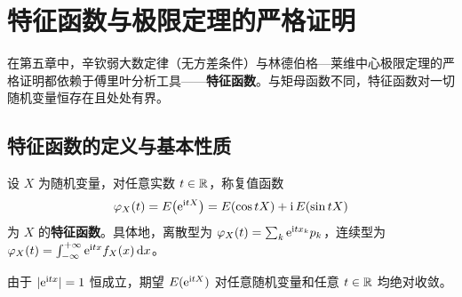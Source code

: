 \section{特征函数与极限定理的严格证明}
\label{sec:app-characteristic-clt}

在第五章中，辛钦弱大数定律（无方差条件）与林德伯格—莱维中心极限定理的严格证明都依赖于傅里叶分析工具——\textbf{特征函数}。与矩母函数不同，特征函数对一切随机变量恒存在且处处有界。

\subsection{特征函数的定义与基本性质}

\begin{definition}[特征函数]
\label{def:characteristic-function}
设 $X$ 为随机变量，对任意实数 $t\in\mathbb{R}$，称复值函数
\begin{equation}
  \varphi_X(t)=E\bigl(\mathrm{e}^{\mathrm{i} tX}\bigr)=E(\cos tX)+\mathrm{i}\,E(\sin tX)
  \label{eq:char-func-def}
\end{equation}
为 $X$ 的\textbf{特征函数}。具体地，离散型为 $\varphi_X(t)=\sum_{k}\mathrm{e}^{\mathrm{i} tx_k}p_k$，连续型为 $\varphi_X(t)=\int_{-\infty}^{+\infty}\mathrm{e}^{\mathrm{i} tx}f_X(x)\mathop{}\!\mathrm{d} x$。
\end{definition}

由于 $\lvert\mathrm{e}^{\mathrm{i} tx}\rvert=1$ 恒成立，期望 $E(\mathrm{e}^{\mathrm{i} tX})$ 对任意随机变量和任意 $t\in\mathbb{R}$ 均绝对收敛。

